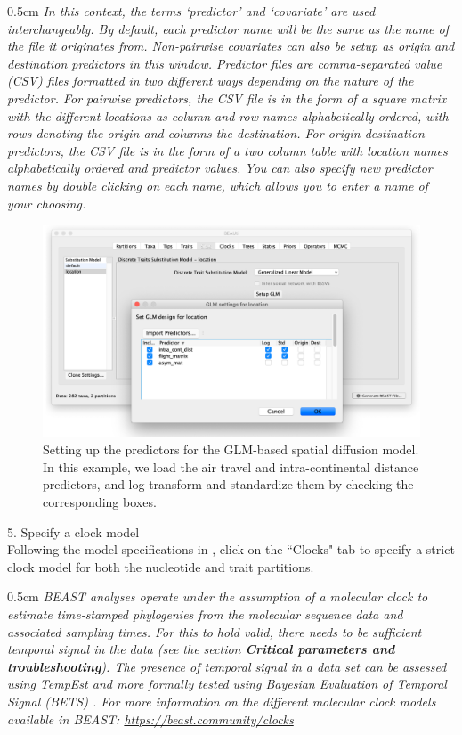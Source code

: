 \documentclass{article}
\newcommand{\ann}[1]{
\begin{adjustwidth}{0.5cm}{}
\it{#1}\\
\end{adjustwidth}}
\begin{document}
\ann{In this context, the terms `predictor' and `covariate' are used interchangeably.
By default, each predictor name will be the same as the name of the file it originates from. Non-pairwise covariates can also be setup as origin and destination predictors in this window. Predictor files are comma-separated value (CSV) files formatted in two different ways depending on the nature of the predictor. For pairwise predictors, the CSV file is in the form of a square matrix with the different locations as column and row names alphabetically ordered, with rows denoting the origin and columns the destination. For origin-destination predictors, the CSV file is in the form of a two column table with location names alphabetically ordered and predictor values.
You can also specify new predictor names by double clicking on each name, which allows you to enter a name of your choosing.
}

\begin{figure}[!ht]
    \centering
    \includegraphics[width=1.0\textwidth]{figs/GLM.pdf}
    \caption{Setting up the predictors for the GLM-based spatial diffusion model. In this example, we load the air travel and intra-continental distance predictors, and log-transform and standardize them by checking the corresponding boxes.}
    \label{fig:GLM}
\end{figure}

5. Specify a clock model\\

Following the model specifications in \cite{travhist}, click on the ``Clocks" tab to specify a strict clock model for both the nucleotide and trait partitions.\\
\ann{BEAST analyses operate under the assumption of a molecular clock to estimate time-stamped phylogenies from the molecular sequence data and associated sampling times.
For this to hold valid, there needs to be sufficient temporal signal in the data (see the section \textbf{Critical parameters and troubleshooting}).
The presence of temporal signal in a data set can be assessed using TempEst \cite{tempest} and more formally tested using Bayesian Evaluation of Temporal Signal (BETS) \cite{bets}.
For more information on the different molecular clock models available in BEAST: {\upshape\url{https://beast.community/clocks}}}
\end{document}
